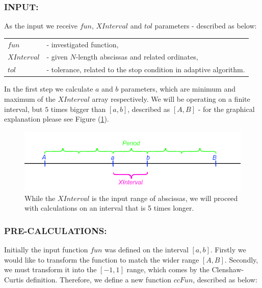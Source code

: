 \documentclass[12pt,twoside,a4paper]{article}
\numberwithin{equation}{subsection}
\numberwithin{figure}{subsection}
\begin{document}
\subsubsection*{INPUT:}
 
As the input we receive $fun$, $XInterval$ and $tol$ parameters - described as below: 

\begin{tabular}{ l l }

  $fun$       &- investigated function, \\
  $XInterval$ &- given $N$-length abscissas and related ordinates, \\
  $tol$       &- tolerance, related to the stop condition in adaptive algorithm. \\
  
\end{tabular}

In the first step we calculate $a$ and $b$ parameters, which are minimum and maximum of the $XInterval$ array respectively. We will be operating on a finite interval, but $5$ times bigger than $[a, b]$, described as $[A, B]$ - for the graphical explanation please see Figure (\ref{fig:cci_bigger_interval}).


\begin{figure} 
  \includegraphics[width=150mm]{img/cci_bigger_interval.png}
  \caption{While the $XInterval$ is the input range of abscissas, we will proceed with calculations on an interval that is 5 times longer. \label{fig:cci_bigger_interval}
  }
\end{figure}

\subsubsection*{PRE-CALCULATIONS:}

Initially the input function $fun$ was defined on the interval $[a, b]$. Firstly we would like to transform the function to match the wider range $[A, B]$. Secondly, we must transform it into the $[-1, 1]$ range, which comes by the Clenshaw-Curtis definition. Therefore, we define a new function $ccFun$, described as below:
\end{document}
